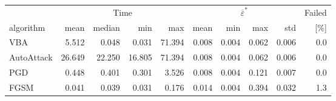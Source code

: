 \small
\setlength{\tabcolsep}{3pt}
\begin{tabular}{lrrrrrrrrr}
\toprule
 & \multicolumn{4}{c}{Time} & \multicolumn{4}{c}{$\overline{\varepsilon}^*$} & Failed \\
  \cmidrule(lr){2-5}\cmidrule(lr){6-9}
algorithm & mean & median & min & max & mean & min & max & std & [\%] \\
\midrule
VBA & 5.512 & 0.048 & 0.031 & 71.394 & 0.008 & 0.004 & 0.062 & 0.006 & 0.0 \\
AutoAttack & 26.649 & 22.250 & 16.805 & 71.394 & 0.008 & 0.004 & 0.062 & 0.006 & 0.0 \\
PGD & 0.448 & 0.401 & 0.301 & 3.526 & 0.008 & 0.004 & 0.121 & 0.007 & 0.0 \\
FGSM & 0.041 & 0.039 & 0.031 & 0.176 & 0.014 & 0.004 & 0.394 & 0.032 & 1.3 \\
\bottomrule
\end{tabular}
